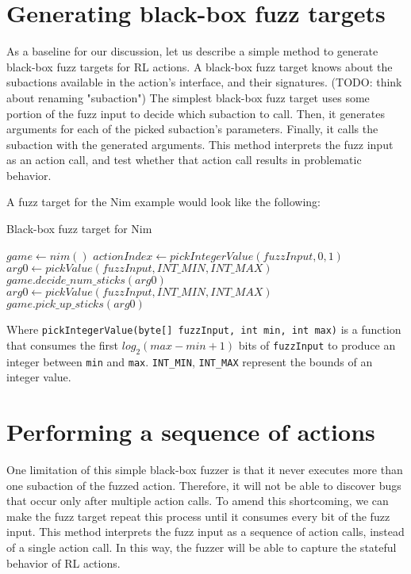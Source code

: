\section{Generating black-box fuzz targets}
As a baseline for our discussion, let us describe a simple method to generate black-box fuzz targets for RL actions.
A black-box fuzz target knows about the subactions available in the action's interface, and their signatures. (TODO: think about renaming "subaction")
The simplest black-box fuzz target uses some portion of the fuzz input to decide which subaction to call.
Then, it generates arguments for each of the picked subaction's parameters.
Finally, it calls the subaction with the generated arguments.
This method interprets the fuzz input as an action call, and test whether that action call results in problematic behavior.

A fuzz target for the Nim example would look like the following:
\begin{algorithm}[H]
    \caption{Black-box fuzz target for Nim}
    \begin{algorithmic}[1]
    \STATE $game \gets nim()$
    \STATE $actionIndex \gets pickIntegerValue(fuzzInput, 0, 1)$
        \STATE $arg0 \gets pickValue(fuzzInput, INT\_MIN, INT\_MAX)$
        \STATE $game.decide\_num\_sticks(arg0)$
    \ENDIF
        \STATE $arg0 \gets pickValue(fuzzInput, INT\_MIN, INT\_MAX)$
        \STATE $game.pick\_up\_sticks(arg0)$
    \ENDIF
    \end{algorithmic}
\end{algorithm}
Where \texttt{pickIntegerValue(byte[] fuzzInput, int min, int max)} is a function that consumes the first $log_2(max - min + 1)$ bits of \texttt{fuzzInput}
 to produce an integer between \texttt{min} and \texttt{max}.
 \texttt{INT\_MIN}, \texttt{INT\_MAX} represent the bounds of an integer value.

\section{Performing a sequence of actions}
One limitation of this simple black-box fuzzer is that it never executes more than one subaction of the fuzzed action.
Therefore, it will not be able to discover bugs that occur only after multiple action calls.
To amend this shortcoming, we can make the fuzz target repeat this process until it consumes every bit of the fuzz input.
This method interprets the fuzz input as a sequence of action calls, instead of a single action call.
In this way, the fuzzer will be able to capture the stateful behavior of RL actions.

